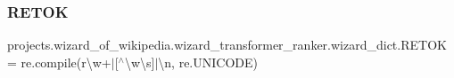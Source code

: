 \subsubsection{\texorpdfstring{R\+E\+T\+OK}{RETOK}}
{\footnotesize\ttfamily projects.\+wizard\+\_\+of\+\_\+wikipedia.\+wizard\+\_\+transformer\+\_\+ranker.\+wizard\+\_\+dict.\+R\+E\+T\+OK = re.\+compile(r\textquotesingle{}\textbackslash{}w+$\vert$\mbox{[}$^\wedge$\textbackslash{}w\textbackslash{}s\mbox{]}$\vert$\textbackslash{}n\textquotesingle{}, re.\+U\+N\+I\+C\+O\+DE)}

